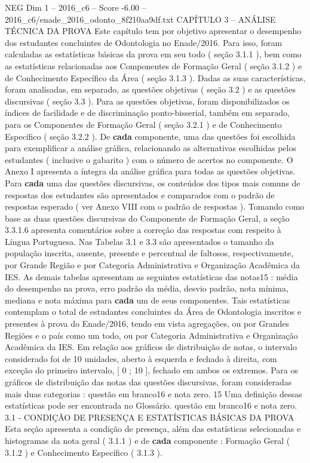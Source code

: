 \begin{textsample}{NEG Dim 1 – 2016\_c6 – Score -6.00 – 2016\_c6/enade\_2016\_odonto\_8f210aa9df.txt}  \label{ex:f1_neg_044}
CAPÍTULO 3 – ANÁLISE TÉCNICA DA PROVA Este capítulo tem por objetivo apresentar o desempenho dos estudantes concluintes de Odontologia no Enade/2016.
Para isso, foram calculadas as estatísticas básicas da prova em seu todo ( seção 3.1.1 ), bem como as estatísticas relacionadas aos Componentes de Formação Geral ( seção 3.1.2 ) e de Conhecimento Específico da Área ( seção 3.1.3 ).
Dadas as suas características, foram analisadas, em separado, as questões objetivas ( seção 3.2 ) e as questões discursivas ( seção 3.3 ).
Para as questões objetivas, foram disponibilizados os índices de facilidade e de discriminação ponto-bisserial, também em separado, para os Componentes de Formação Geral ( seção 3.2.1 ) e de Conhecimento Específico ( seção 3.2.2 ).
De \textbf{cada} componente, uma das questões foi escolhida para exemplificar a análise gráfica, relacionando as alternativas escolhidas pelos estudantes ( inclusive o gabarito ) com o número de acertos no componente.
O Anexo I apresenta a íntegra da análise gráfica para todas as questões objetivas.
Para \textbf{cada} uma das questões discursivas, os conteúdos dos tipos mais comuns de respostas dos estudantes são apresentados e comparados com o padrão de respostas esperado ( ver Anexo VIII com o padrão de respostas ).
Tomando como base as duas questões discursivas do Componente de Formação Geral, a seção 3.3.1.6 apresenta comentários sobre a correção das respostas com respeito à Língua Portuguesa.
Nas Tabelas 3.1 e 3.3 são apresentados o tamanho da população inscrita, ausente, presente e percentual de faltosos, respectivamente, por Grande Região e por Categoria Administrativa e Organização Acadêmica da IES.
As demais tabelas apresentam as seguintes estatísticas das notas15 : média do desempenho na prova, erro padrão da média, desvio padrão, nota mínima, mediana e nota máxima para \textbf{cada} um de seus componentes.
Tais estatísticas contemplam o total de estudantes concluintes da Área de Odontologia inscritos e presentes à prova do Enade/2016, tendo em vista agregações, ou por Grandes Regiões e o país como um todo, ou por Categoria Administrativa e Organização Acadêmica da IES.
Em relação aos gráficos de distribuição de notas, o intervalo considerado foi de 10 unidades, aberto à esquerda e fechado à direita, com exceção do primeiro intervalo, [ 0 ; 10 ], fechado em ambos os extremos.
Para os gráficos de distribuição das notas das questões discursivas, foram consideradas mais duas categorias : questão em branco16 e nota zero. 15 Uma definição dessas estatísticas pode ser encontrada no Glossário. questão em branco16 e nota zero. 3.1 - CONDIÇÃO DE PRESENÇA E ESTATÍSTICAS BÁSICAS DA PROVA Esta seção apresenta a condição de presença, além das estatísticas selecionadas e histogramas da nota geral ( 3.1.1 ) e de \textbf{cada} componente : Formação Geral ( 3.1.2 ) e Conhecimento Específico ( 3.1.3 ).

\end{textsample}

